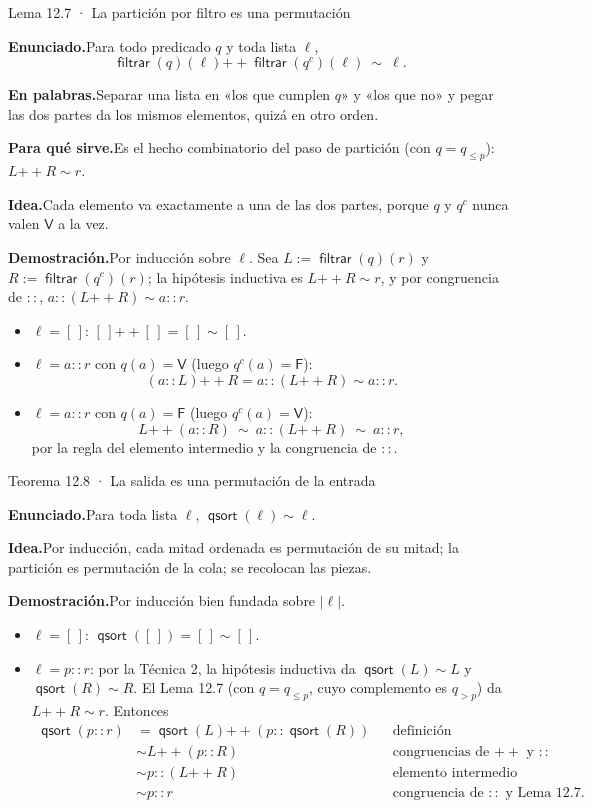\documentclass[11pt,a4paper]{article}
\newcommand{\campo}[1]{\par\smallskip\noindent\textbf{#1}\enspace}
\newcommand{\enunciado}{\campo{Enunciado.}}
\newcommand{\palabras}{\campo{En palabras.}}
\newcommand{\sirve}{\campo{Para qué sirve.}}
\newcommand{\idea}{\campo{Idea.}}
\newcommand{\prueba}{\campo{Demostración.}}
\newcommand{\Perm}{\sim}
\newcommand{\concat}{\mathbin{+\!\!+}}
\newcommand{\qs}{\operatorname{\mathsf{qsort}}}
\newcommand{\filt}{\operatorname{\mathsf{filtrar}}}
\newcommand{\len}[1]{\lvert #1\rvert}
\newcommand{\V}{\mathsf{V}}
\newcommand{\F}{\mathsf{F}}
\begin{document}
\begin{resultado}{Lema 12.7 · La partición por filtro es una permutación}
\enunciado Para todo predicado \(q\) y toda lista \(\ell\),
\[
\filt(q)(\ell)\concat\filt(q^c)(\ell)\ \Perm\ \ell .
\]

\palabras Separar una lista en «los que cumplen \(q\)» y «los que no» y pegar
las dos partes da los mismos elementos, quizá en otro orden.

\sirve Es el hecho combinatorio del paso de partición (con \(q=q_{\leq p}\)):
\(L\concat R\Perm r\).

\idea Cada elemento va exactamente a una de las dos partes, porque \(q\) y
\(q^c\) nunca valen \(\V\) a la vez.

\prueba Por inducción sobre \(\ell\). Sea \(L:=\filt(q)(r)\) y
\(R:=\filt(q^c)(r)\); la hipótesis inductiva es \(L\concat R\Perm r\), y por
congruencia de \(::\), \(a::(L\concat R)\Perm a::r\).
\begin{itemize}
  \item \(\ell=[\,]\): \([\,]\concat[\,]=[\,]\Perm[\,]\).
  \item \(\ell=a::r\) con \(q(a)=\V\) (luego \(q^c(a)=\F\)):
    \[
    (a::L)\concat R=a::(L\concat R)\Perm a::r .
    \]
  \item \(\ell=a::r\) con \(q(a)=\F\) (luego \(q^c(a)=\V\)):
    \[
    L\concat(a::R)\ \Perm\ a::(L\concat R)\ \Perm\ a::r ,
    \]
    por la regla del elemento intermedio y la congruencia de \(::\).
\end{itemize}
\end{resultado}

\begin{resultado}{Teorema 12.8 · La salida es una permutación de la entrada}
\enunciado Para toda lista \(\ell\), \(\qs(\ell)\Perm\ell\).

\idea Por inducción, cada mitad ordenada es permutación de su mitad; la
partición es permutación de la cola; se recolocan las piezas.

\prueba Por inducción bien fundada sobre \(\len\ell\).
\begin{itemize}
  \item \(\ell=[\,]\): \(\qs([\,])=[\,]\Perm[\,]\).
  \item \(\ell=p::r\): por la Técnica 2, la hipótesis inductiva da
    \(\qs(L)\Perm L\) y \(\qs(R)\Perm R\). El Lema 12.7 (con
    \(q=q_{\leq p}\), cuyo complemento es \(q_{>p}\)) da \(L\concat R\Perm r\).
    Entonces
    \[
    \begin{aligned}
    \qs(p::r)&=\qs(L)\concat(p::\qs(R)) &&\text{definición}\\
    &\Perm L\concat(p::R) &&\text{congruencias de }\concat\text{ y }::\\
    &\Perm p::(L\concat R) &&\text{elemento intermedio}\\
    &\Perm p::r &&\text{congruencia de }::\text{ y Lema 12.7.}
    \end{aligned}
    \]
\end{itemize}
\end{resultado}
\end{document}
